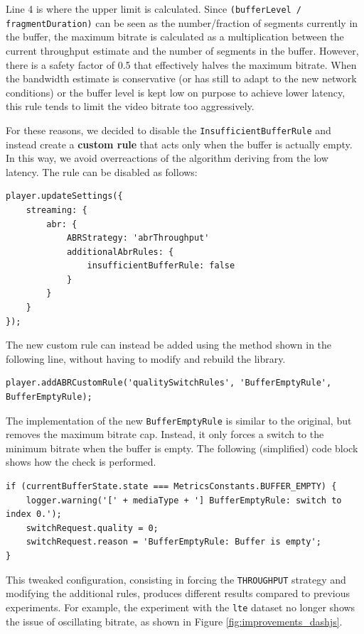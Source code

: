 Line 4 is where the upper limit is calculated. Since \texttt{(bufferLevel / fragmentDuration)} can be seen as the number/fraction of segments currently in the buffer, the maximum bitrate is calculated as a multiplication between the current throughput estimate and the number of segments in the buffer. However, there is a safety factor of 0.5 that effectively halves the maximum bitrate. When the bandwidth estimate is conservative (or has still to adapt to the new network conditions) or the buffer level is kept low on purpose to achieve lower latency, this rule tends to limit the video bitrate too aggressively.

For these reasons, we decided to disable the \texttt{InsufficientBufferRule} and instead create a \textbf{custom rule} that acts only when the buffer is actually empty. In this way, we avoid overreactions of the algorithm deriving from the low latency. The rule can be disabled as follows:

\begin{verbatim}
player.updateSettings({
    streaming: {
        abr: {
            ABRStrategy: 'abrThroughput'
            additionalAbrRules: {
                insufficientBufferRule: false
            }
        }
    }
});
\end{verbatim}

The new custom rule can instead be added using the method shown in the following line, without having to modify and rebuild the library.

\begin{verbatim}
player.addABRCustomRule('qualitySwitchRules', 'BufferEmptyRule', BufferEmptyRule);
\end{verbatim}

The implementation of the new \texttt{BufferEmptyRule} is similar to the original, but removes the maximum bitrate cap. Instead, it only forces a switch to the minimum bitrate when the buffer is empty. The following (simplified) code block shows how the check is performed.

\begin{verbatim}
if (currentBufferState.state === MetricsConstants.BUFFER_EMPTY) {
    logger.warning('[' + mediaType + '] BufferEmptyRule: switch to index 0.');
    switchRequest.quality = 0;
    switchRequest.reason = 'BufferEmptyRule: Buffer is empty';
}
\end{verbatim}

This tweaked configuration, consisting in forcing the \texttt{THROUGHPUT} strategy and modifying the additional rules, produces different results compared to previous experiments. For example, the experiment with the \texttt{lte} dataset no longer shows the issue of oscillating bitrate, as shown in Figure \ref{fig:improvements_dashjs}.

